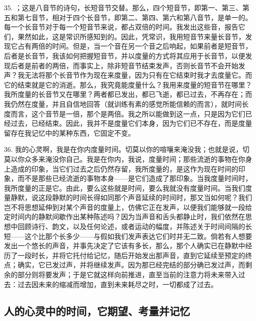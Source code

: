 35. ；这是八音节的诗句，长短音节交替。那么，四个短音节，即第一、第三、第五和第七音节，相对于四个长音节，即第二、第四、第六和第八音节，是单一的。每一个长音节对于每一个短音节来说，都占双倍的时间。我发出这些音，报告它们，果然如此，这是常识所感知到的。因此，凭常识，我用短音节来量长音节，发现它占有两倍的时间。但是，当一个音在另一个音之后响起，如果前者是短音节，后者是长音节，我该如何把握短音节，并以度量的方式将其应用于长音节，以便发现后者是前者的两倍，而事实上，除非短音节结束发声，否则长音节不会开始发声？我无法将那个长音节作为现在来度量，因为只有在它结束时我才去度量它。而它的结束就是它的消逝。那么，我究竟能度量什么？我用来度量的短音节在哪里？我所度量的长音节又在哪里？两者都已发出，都已飞逝，都已过去，不再存在；而我仍然在度量，并且自信地回答（就训练有素的感觉所能信赖的而言），就时间长度而言，这个音节是一倍，那个是两倍。我之所以能做到这一点，只是因为它们已经过去，已经结束。因此，我并不是度量它们本身，因为它们已不存在，而是度量留存在我记忆中的某种东西，它固定不变。\par

36. 我的心灵啊，我是在你内度量时间。切莫以你的喧嚷来淹没我；也就是说，切莫以你众多来淹没你自己。我是在你内，我说，度量时间；那些流逝的事物在你身上造成的印象，当它们过去之后仍然存留，我所度量的，是这作为现在时间的印象，而不是那些已经流逝的事物本身——是它们造成了那印象。当我度量时间时，我所度量的正是它。由此，要么这些就是时间，要么我就没有度量时间。当我们度量静默，说这段静默的时间长得如同那个声音延续的时间时，那又当如何呢？我们岂不将思想延伸到对某个声音的度量上，仿佛它正在发声，以便我们能够就一段给定时间内的静默间歇作出某种陈述吗？因为当声音和舌头都静止时，我们依然在思想中回顾诗行、韵文，以及任何论述，或者运动的幅度，并陈述关于时间间隔的长短——这个比那个长多少——与假如我们发声表达它们时并无二致。倘若有人想要发出一个悠长的声音，并事先决定了它该有多长，那么，那个人确实已在静默中经历了一段时长，并将它托付给记忆，随后开始发出那声音，直到它延续至预定的终点；确实，它已发过声，并将继续发声。因为那已经完结的部分确已发过声，而剩余的部分则将要发声；于是它就这样向前推进，直至当前的注意力将未来带入过去：过去因未来的缩减而增加，直到未来耗尽之时，一切都成了过去。\par


\subsection{人的心灵中的时间，它期望、考量并记忆}

